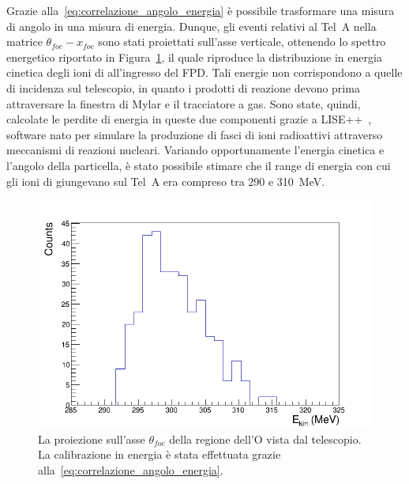 Grazie alla~\ref{eq:correlazione_angolo_energia} è possibile trasformare una misura di angolo in una misura di energia.
Dunque, gli eventi relativi al Tel~A nella matrice $\theta_{foc} - x_{foc}$ sono stati proiettati sull'asse verticale, ottenendo lo spettro energetico riportato in Figura~\ref{fig:spettro_ekin}, il quale riproduce la distribuzione in energia cinetica degli ioni di  all'ingresso del FPD.
Tali energie non corrispondono a quelle di incidenza sul telescopio, in quanto i prodotti di reazione devono prima attraversare la finestra di Mylar e il tracciatore a gas.
Sono state, quindi, calcolate le perdite di energia in queste due componenti grazie a LISE++~\cite{tarasov:nimb08}, software nato per simulare la produzione di fasci di ioni radioattivi attraverso meccanismi di reazioni nucleari.
Variando opportunamente l'energia cinetica e l'angolo della particella, è stato possibile stimare che il range di energia con cui gli ioni di  giungevano sul Tel~A era compreso tra 290 e 310~MeV.
\begin{figure} [!p]
	\centering
	\includegraphics[width=\textwidth, keepaspectratio]{Grafici_Tesi/Test/spettro_ekin.png}
	\caption{La proiezione sull'asse $\theta_{foc}$ della  regione dell'O vista dal telescopio. La calibrazione in energia è stata effettuata grazie alla~\ref{eq:correlazione_angolo_energia}.} \label{fig:spettro_ekin}
\end{figure}


\section{}

